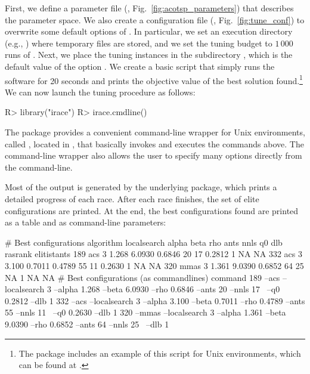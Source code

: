 \documentclass[article,a4paper,nojss,notitle]{jss}
\newcommand{\irace}{\pkg{irace}\xspace}
\newcommand{\race}{\pkg{race}\xspace}
\newcommand{\aR}{\proglang{R}\xspace}
\newcommand{\parameter}[1]{\code{#1}}
\newcommand{\SoftwarePackage}{\pkg}
\newcommand{\ACOTSP}{\SoftwarePackage{ACOTSP}\xspace}
\begin{document}
First, we define a parameter file (,
Fig.~\ref{fig:acotsp_parameters}) that describes the parameter space.
We also create a configuration file (,
Fig.~\ref{fig:tune_conf}) to overwrite some default options of \irace.
In particular, we set an execution directory (e.g., )
where temporary files are stored, and we set the tuning budget to
$1\,000$ runs of \ACOTSP. Next, we place the tuning instances in the
subdirectory , which is the default value of the
option \parameter{instanceDir}. We create a basic 
script that simply runs the \ACOTSP software for 20 seconds and prints
the objective value of the best solution found.\footnote{The package
  includes an example of this  script for Unix
  environments, which can be found at
  .}
We can now launch the tuning procedure as follows:
  \begin{CodeInput}
R> library("irace")
R> irace.cmdline()
\end{CodeInput}

The package provides a convenient command-line wrapper for Unix
environments, called , located in
, that basically
invokes \aR and executes the commands above. The command-line wrapper
also allows the user to specify many options directly from the
command-line.

Most of the output is generated by the underlying \race package, which
prints a detailed progress of each race. After each race finishes, the
set of elite configurations are printed. At the end, the best
configurations found are printed as a table and as command-line
parameters:

\begin{footnotesize}
\begin{CodeOutput}
# Best configurations
    algorithm localsearch alpha   beta    rho ants nnls     q0 dlb rasrank elitistants
189       acs           3 1.268 6.0930 0.6846   20   17 0.2812   1      NA          NA
332       acs           3 3.100 0.7011 0.4789   55   11 0.2630   1      NA          NA
320      mmas           3 1.361 9.0390 0.6852   64   25     NA   1      NA          NA
# Best configurations (as commandlines)
                                                                                  command
189  --acs --localsearch 3 --alpha 1.268 --beta 6.0930 --rho  0.6846 --ants 20 --nnls 17  \
    --q0 0.2812 --dlb 1
332  --acs --localsearch 3 --alpha 3.100 --beta 0.7011 --rho  0.4789 --ants 55 --nnls 11  \
    --q0 0.2630 --dlb 1
320  --mmas --localsearch 3 --alpha 1.361 --beta 9.0390 --rho  0.6852 --ants 64 --nnls 25 \
    --dlb 1
\end{CodeOutput}
\end{footnotesize}
\end{document}
